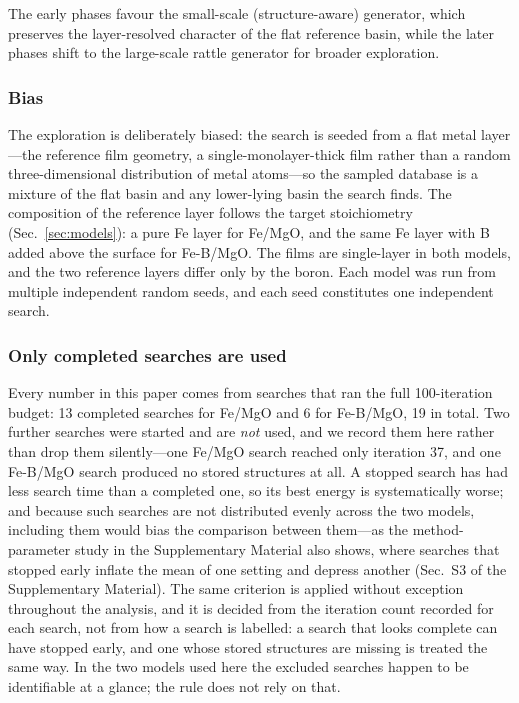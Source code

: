 The early phases favour the small-scale (structure-aware) generator, which preserves the
layer-resolved character of the flat reference basin, while the later phases shift to the
large-scale rattle generator for broader exploration.

\subsubsection{Bias} The exploration is deliberately biased: the search is seeded from a
flat metal layer---the reference film geometry, a single-monolayer-thick film rather than a
random three-dimensional distribution of metal atoms---so the sampled database is a mixture of the
flat basin and any lower-lying basin the search finds. The composition of the reference layer
follows the target stoichiometry (Sec.~\ref{sec:models}): a pure Fe layer for Fe/MgO, and the same Fe
layer with B added above the surface for Fe-B/MgO. The films are single-layer in both models, and the
two reference layers differ only by the boron. Each model was run from multiple independent random
seeds, and each seed constitutes one independent search.

\subsubsection{Only completed searches are used} Every number in this paper comes from searches that ran
the full 100-iteration budget: 13 completed searches for Fe/MgO and 6 for Fe-B/MgO, 19 in
total. Two further searches were started and are \emph{not} used, and we record them here rather than
drop them silently---one Fe/MgO search reached only iteration 37, and one Fe-B/MgO search produced no
stored structures at all. A stopped search has had less search time than a completed one, so its best
energy is systematically worse; and because such searches are not distributed evenly across the two
models, including them would bias the comparison between them---as the method-parameter study in the
Supplementary Material also shows, where searches that stopped early inflate the mean of one setting
and depress another (Sec.~S3 of the Supplementary Material). The same criterion is applied without
exception throughout the analysis, and it is decided from the iteration count recorded for
each search, not from how a search is labelled: a search that looks complete can have stopped early,
and one whose stored structures are missing is treated the same way. In the two models used here the
excluded searches happen to be identifiable at a glance; the rule does not rely on that.

